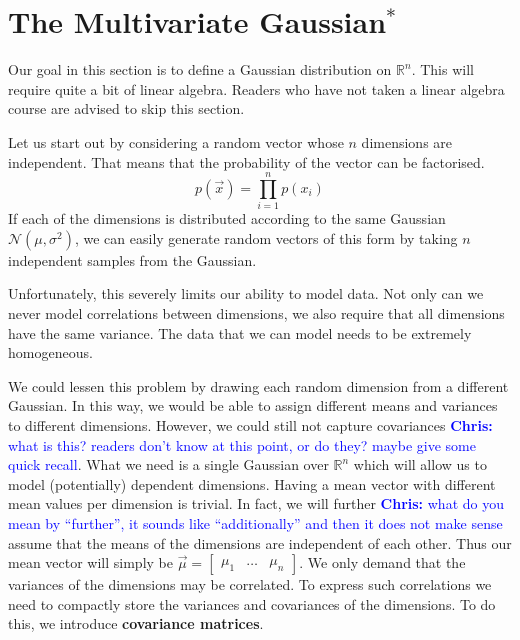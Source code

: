 \documentclass[a4paper,11pt,leqno]{report}\usepackage[]{graphicx}\usepackage[]{color}
\newcommand{\N}[2]{\mathcal{N}\left( #1, #2 \right)}
\newcommand{\chris}[1]{ \textcolor{blue}{\textbf{Chris:} #1}}
\begin{document}
%

\section{The Multivariate Gaussian$ ^{*} $}\label{sec:mvGauss}

Our goal in this section is to define a Gaussian distribution on $ \mathbb{R}^{n} $. This will require quite a bit of linear algebra. Readers who have not taken
a linear algebra course are advised to skip this section.

Let us start out by considering a random vector whose $ n $ dimensions are independent. That means that the probability of the vector can be factorised.
\begin{equation}
p(\vec{x}) = \prod_{i=1}^{n} p(x_{i})
\end{equation}
If each of the dimensions is distributed according to the same Gaussian $ \mathcal{N}(\mu, \sigma^{2}) $, we can easily generate random vectors of this form by taking $ n $ independent samples from the Gaussian.

Unfortunately, this severely limits our ability to model data. Not only can we never model correlations between dimensions, we also require that all dimensions
have the same variance. The data that we can model needs to be extremely homogeneous.

We could lessen this problem by drawing each random dimension from a different Gaussian. In this way, we would be able to assign different means and variances to different
dimensions. However, we could still not capture covariances\chris{what is this? readers don't know at this point, or do they? maybe give some quick recall}. What we need is a single Gaussian over $ \mathbb{R}^{n} $ which will allow us to model (potentially) dependent
dimensions. Having a mean vector with different mean values per dimension is trivial. In fact, we will further \chris{what do you mean by ``further'', it sounds like ``additionally'' and then it does not make sense} assume that the means of the dimensions are independent of
each other. Thus our mean vector will simply be 
$ \vec{\mu} = \begin{bmatrix}
\mu_{1} & \ldots & \mu_{n}
\end{bmatrix} $. We only demand that the variances of the dimensions may be correlated. To express such correlations we need to compactly store the variances and 
covariances of the dimensions. To do this, we introduce \textbf{covariance matrices}.
\end{document}
